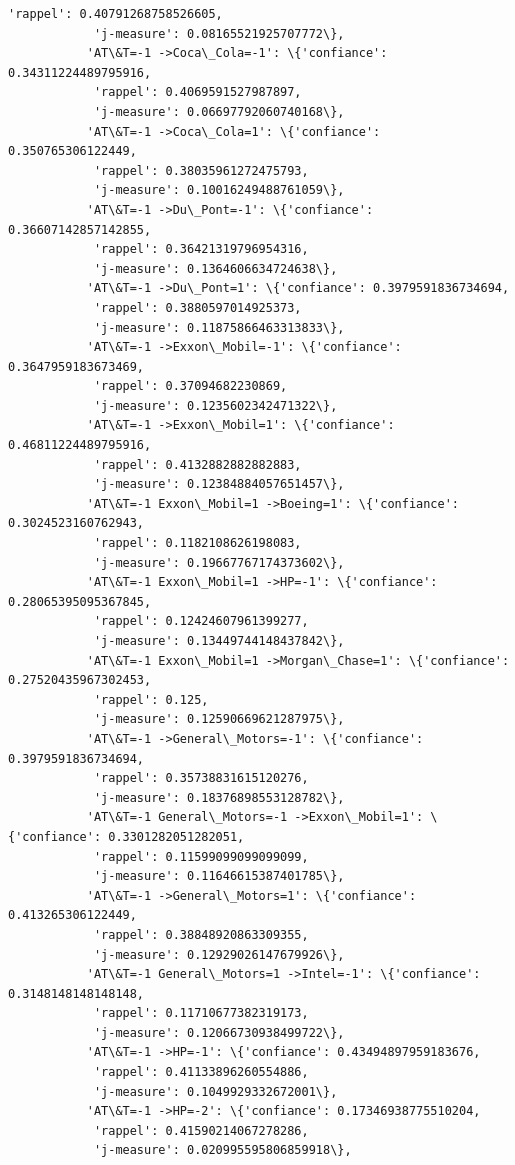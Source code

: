 \documentclass[11pt]{article}
\begin{document}
\begin{Verbatim}[commandchars=\\\{\}]
            'rappel': 0.40791268758526605,
            'j-measure': 0.08165521925707772\},
           'AT\&T=-1 ->Coca\_Cola=-1': \{'confiance': 0.34311224489795916,
            'rappel': 0.4069591527987897,
            'j-measure': 0.06697792060740168\},
           'AT\&T=-1 ->Coca\_Cola=1': \{'confiance': 0.350765306122449,
            'rappel': 0.38035961272475793,
            'j-measure': 0.10016249488761059\},
           'AT\&T=-1 ->Du\_Pont=-1': \{'confiance': 0.36607142857142855,
            'rappel': 0.36421319796954316,
            'j-measure': 0.1364606634724638\},
           'AT\&T=-1 ->Du\_Pont=1': \{'confiance': 0.3979591836734694,
            'rappel': 0.3880597014925373,
            'j-measure': 0.11875866463313833\},
           'AT\&T=-1 ->Exxon\_Mobil=-1': \{'confiance': 0.3647959183673469,
            'rappel': 0.37094682230869,
            'j-measure': 0.1235602342471322\},
           'AT\&T=-1 ->Exxon\_Mobil=1': \{'confiance': 0.46811224489795916,
            'rappel': 0.4132882882882883,
            'j-measure': 0.12384884057651457\},
           'AT\&T=-1 Exxon\_Mobil=1 ->Boeing=1': \{'confiance': 0.3024523160762943,
            'rappel': 0.1182108626198083,
            'j-measure': 0.19667767174373602\},
           'AT\&T=-1 Exxon\_Mobil=1 ->HP=-1': \{'confiance': 0.28065395095367845,
            'rappel': 0.12424607961399277,
            'j-measure': 0.13449744148437842\},
           'AT\&T=-1 Exxon\_Mobil=1 ->Morgan\_Chase=1': \{'confiance': 0.27520435967302453,
            'rappel': 0.125,
            'j-measure': 0.12590669621287975\},
           'AT\&T=-1 ->General\_Motors=-1': \{'confiance': 0.3979591836734694,
            'rappel': 0.35738831615120276,
            'j-measure': 0.18376898553128782\},
           'AT\&T=-1 General\_Motors=-1 ->Exxon\_Mobil=1': \{'confiance': 0.3301282051282051,
            'rappel': 0.11599099099099099,
            'j-measure': 0.11646615387401785\},
           'AT\&T=-1 ->General\_Motors=1': \{'confiance': 0.413265306122449,
            'rappel': 0.38848920863309355,
            'j-measure': 0.12929026147679926\},
           'AT\&T=-1 General\_Motors=1 ->Intel=-1': \{'confiance': 0.3148148148148148,
            'rappel': 0.11710677382319173,
            'j-measure': 0.12066730938499722\},
           'AT\&T=-1 ->HP=-1': \{'confiance': 0.43494897959183676,
            'rappel': 0.41133896260554886,
            'j-measure': 0.1049929332672001\},
           'AT\&T=-1 ->HP=-2': \{'confiance': 0.17346938775510204,
            'rappel': 0.41590214067278286,
            'j-measure': 0.020995595806859918\},

\end{Verbatim}
\end{document}
